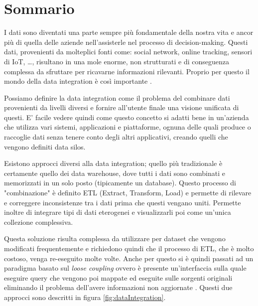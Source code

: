 \chapter*{Sommario}
\label{cha:intro}

I dati sono diventati una parte sempre più fondamentale della nostra vita e ancor più di quella delle aziende nell'assisterle nel processo di decision-making.
Questi dati, provenienti da molteplici fonti come: social network, online tracking, sensori di IoT, \dots, risultano in una mole enorme, non strutturati e
di conseguenza complessa da sfruttare per ricavarne informazioni rilevanti.
Proprio per questo il mondo della data integration è così importante \cite{DataIntegration}.

Possiamo definire la data integration come il problema del combinare dati provenienti da livelli diversi e fornire all'utente finale una 
visione unificata di questi\cite{dataIntegrationDef}. E' facile vedere quindi come questo concetto si adatti bene in un'azienda che utilizza vari sistemi, applicazioni 
e piattaforme, ognuna delle quali produce o raccoglie dati senza tenere conto degli altri applicativi, creando quelli che vengono definiti data silos.

Esistono approcci diversi alla data integration; quello più tradizionale è certamente quello dei data warehouse, dove tutti i dati sono combinati e memorizzati in un solo posto (tipicamente un database). 
Questo processo di "combinazione" è definito ETL (Extract, Transform, Load) e permette di rilevare e correggere inconsistenze tra i dati prima che questi vengano uniti. Permette inoltre di integrare 
tipi di dati eterogenei e visualizzarli poi come un'unica collezione complessiva.

Questa soluzione risulta complessa da utilizzare per dataset che vengono modificati frequentemente e richiedono quindi che il processo di ETL, che è molto costoso, venga re-eseguito molte volte.
Anche per questo si è quindi passati ad un paradigma basato sul \textit{loose coupling} ovvero è presente un'interfaccia sulla quale eseguire query che vengono poi mappate ed eseguite sulle sorgenti originali eliminando il 
problema dell'avere informazioni non aggiornate \cite{DataIntegrationHistory}. Questi due approcci sono descritti in figura \ref{fig:dataIntegration}.

